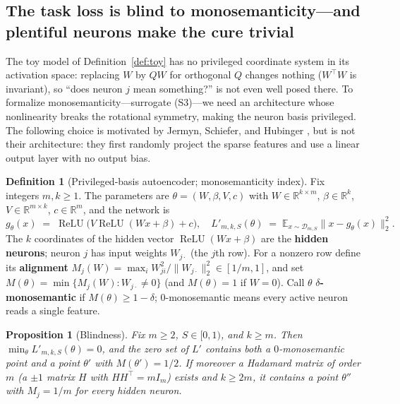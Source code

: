 \documentclass[11pt]{amsart}
\theoremstyle{plain}
\newtheorem{proposition}[theorem]{Proposition}
\theoremstyle{definition}
\newtheorem{definition}[theorem]{Definition}
\DeclareMathOperator{\relu}{ReLU}
\newcommand{\E}{\mathbb{E}}
\newcommand{\R}{\mathbb{R}}
\begin{document}
\subsection{The task loss is blind to monosemanticity---and plentiful neurons make the cure trivial}\label{sec:blind}

The toy model of Definition~\ref{def:toy} has no privileged coordinate system in its activation space: replacing $W$ by $QW$ for orthogonal $Q$ changes nothing ($W^\top W$ is invariant), so ``does neuron $j$ mean something?'' is not even well posed there. To formalize monosemanticity---surrogate (S3)---we need an architecture whose nonlinearity breaks the rotational symmetry, making the neuron basis privileged. The following choice is motivated by Jermyn, Schiefer, and Hubinger \cite{jermyn2022}, but is not their architecture: they first randomly project the sparse features and use a linear output layer with no output bias.

\begin{definition}[Privileged-basis autoencoder; monosemanticity index]\label{def:priv}
Fix integers $m,k\ge1$. The parameters are $\theta=(W,\beta,V,c)$ with $W\in\R^{k\times m}$, $\beta\in\R^k$, $V\in\R^{m\times k}$, $c\in\R^m$, and the network is
\[
g_\theta(x) \;=\; \relu\bigl(V\relu(Wx+\beta)+c\bigr),
\quad
L'_{m,k,S}(\theta) \;=\; \E_{x\sim\mathcal D_{m,S}}\|x-g_\theta(x)\|_2^2 .
\]
The $k$ coordinates of the hidden vector $\relu(Wx+\beta)$ are the \textbf{hidden neurons}; neuron $j$ has input weights $W_{j\cdot}$ (the $j$th row). For a nonzero row define its \textbf{alignment} $M_j(W) = \max_i W_{ji}^2 / \|W_{j\cdot}\|_2^2 \in [1/m, 1]$, and set $M(\theta)=\min\{M_j(W): W_{j\cdot}\neq0\}$ (and $M(\theta)=1$ if $W=0$). Call $\theta$ \textbf{$\delta$-monosemantic} if $M(\theta)\ge 1-\delta$; $0$-monosemantic means every active neuron reads a single feature.
\end{definition}

\begin{proposition}[Blindness]\label{prop:blind}
Fix $m\ge2$, $S\in[0,1)$, and $k\ge m$. Then $\min_\theta L'_{m,k,S}(\theta)=0$, and the zero set of $L'$ contains both a $0$-monosemantic point and a point $\theta'$ with $M(\theta')=1/2$. If moreover a Hadamard matrix of order $m$ (a $\pm1$ matrix $H$ with $HH^{\top}=mI_m$) exists and $k\ge 2m$, it contains a point $\theta''$ with $M_j = 1/m$ for \emph{every} hidden neuron.
\end{proposition}
\end{document}
